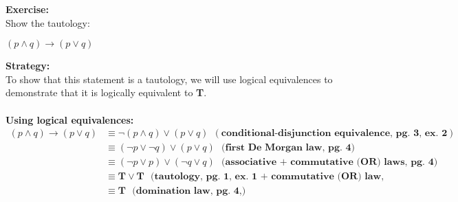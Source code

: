 \begin{tcolorbox}[title=Example 3: Construct tautology]
\textbf{Exercise:}  
\\ Show the tautology: 
\begin{center}
$(p\land q) \rightarrow (p\lor q)$
\end{center}

\textbf{Strategy:}  \\
To show that this statement is a tautology, we will use logical equivalences to demonstrate
that it is logically equivalent to \textbf{T}. \\ \\
\textbf{Using logical equivalences:}   
\begin{align*}
(p\land q) \rightarrow (p\lor q) &\equiv \neg (p \land q) \lor (p \lor q) \ \  (\textbf{conditional-disjunction equivalence, pg. 3, ex. 2}) \\
&\equiv (\neg p \lor   \neg q) \lor (p \lor q) \ \ \ \textbf{(first De Morgan law, pg. 4)} \\
&\equiv (\neg p \lor p) \lor (\neg q \lor q)
\ \ \ \textbf{(associative + commutative (OR) laws, pg. 4)} \\
&\equiv \mathbf{T} \lor \mathbf{T} \ \ \ \textbf{(tautology, pg. 1, ex. 1 + commutative (OR) law, pg. 4) } \\
&\equiv \mathbf{T} \ \ \ \textbf{(domination law, pg. 4,) } 
\end{align*}
\end{tcolorbox}